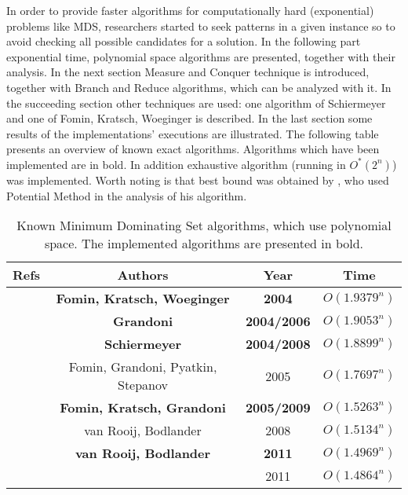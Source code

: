 In order to provide faster algorithms for computationally hard (exponential) problems like MDS, researchers started to seek patterns in a given instance so to avoid checking all possible candidates for a solution.
In the following part exponential time, polynomial space algorithms are presented, together with their analysis. In the next section Measure and Conquer technique is introduced, together with Branch and Reduce algorithms, which can be analyzed with it. In the succeeding section other techniques are used: one algorithm of Schiermeyer and one of Fomin, Kratsch, Woeginger is described. In the last section some results of the implementations' executions are illustrated. The following table presents an overview of known exact algorithms. Algorithms which have been implemented are in bold. In addition exhaustive algorithm (running in $O^*(2^n)$) was implemented. Worth noting is that best bound was obtained by \citeauthor{iwata10.1007/978-3-642-28050-4_4}, who used Potential Method in the analysis of his algorithm.
\begin{table}[ht]
    \centering
    \begin{tabular}{c|c|c|c}
        \textbf{Refs} & \textbf{Authors} & \textbf{Year} & \textbf{Time} \\ \hline
        \textbf{\cite{FominKratschWoeginger10.1007/978-3-540-30559-0_21}} & \textbf{Fomin, Kratsch, Woeginger} & \textbf{2004} & $O(1.9379^n)$\\
        \textbf{\cite{grandoni2004,GRANDONI2006209}} & \textbf{Grandoni} & \textbf{2004/2006} & $O(1.9053^n)$\\
        \textbf{\cite{schiermeyer2004,SCHIERMEYER20083291}} & \textbf{Schiermeyer} & \textbf{2004/2008} & $O(1.8899^n)$\\
        \cite{fgps10.1007/11602613_58} & Fomin, Grandoni, Pyatkin, Stepanov & 2005 & $O(1.7697^n)$ \\
        \textbf{\cite{DBLP:journals/eatcs/FominGK05,10.1007/11523468_16,10.1145/1552285.1552286}} & \textbf{Fomin, Kratsch, Grandoni} & \textbf{2005/2009} & $O(1.5263^n)$\\
        \cite{vanrooij2008design} & van Rooij, Bodlander & 2008 & $O(1.5134^n)$ \\
        \textbf{\cite{VANROOIJ20112147}} & \textbf{van Rooij, Bodlander} & \textbf{2011} & $O(1.4969^n)$ \\
        \cite{iwata10.1007/978-3-642-28050-4_4} & \citeauthor{iwata10.1007/978-3-642-28050-4_4} & 2011 & $O(1.4864^n)$
    \end{tabular}
    \caption{Known Minimum Dominating Set algorithms, which use polynomial space. The implemented algorithms are presented in bold.}
\end{table}

